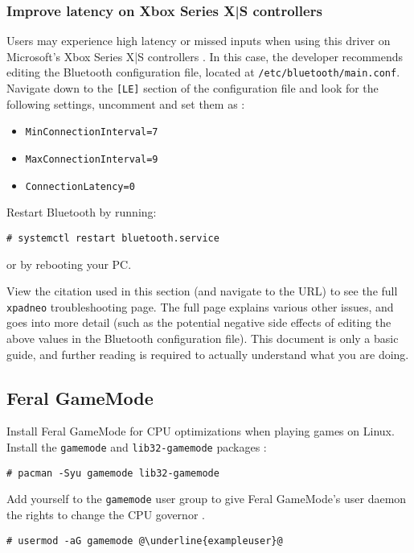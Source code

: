 \documentclass[a4paper]{article}
\begin{document}
\subsubsection{Improve latency on Xbox Series X|S controllers}

Users may experience high latency or missed inputs when using this driver on Microsoft's Xbox Series X|S controllers \cite{xpadneo-troubleshooting}. In this case, the developer recommends editing the Bluetooth configuration file, located at \lstinline|/etc/bluetooth/main.conf|. Navigate down to the \lstinline|[LE]| section of the configuration file and look for the following settings, uncomment and set them as \cite{xpadneo-troubleshooting}:
\begin{itemize}
    \item \lstinline|MinConnectionInterval=7|
    \item \lstinline|MaxConnectionInterval=9|
    \item \lstinline|ConnectionLatency=0|
\end{itemize}

Restart Bluetooth by running:
\begin{lstlisting}
# systemctl restart bluetooth.service
\end{lstlisting}
or by rebooting your PC.

View the citation used in this section (and navigate to the URL) to see the full \lstinline|xpadneo| troubleshooting page.
The full page explains various other issues, and goes into more detail (such as the potential negative side effects of editing the above values in the Bluetooth configuration file).
This document is only a basic guide, and further reading is required to actually understand what you are doing.

\subsection{Feral GameMode}

Install Feral GameMode for CPU optimizations when playing games on Linux.
Install the \lstinline|gamemode| and \lstinline|lib32-gamemode| packages \cite{arch-wiki-gamemode}:

\begin{lstlisting}
# pacman -Syu gamemode lib32-gamemode
\end{lstlisting}

Add yourself to the \lstinline|gamemode| user group to give Feral GameMode's user daemon the rights to change the CPU governor \cite{arch-wiki-gamemode}.
\begin{lstlisting}[escapechar=@]
# usermod -aG gamemode @\underline{exampleuser}@
\end{lstlisting}
\end{document}
